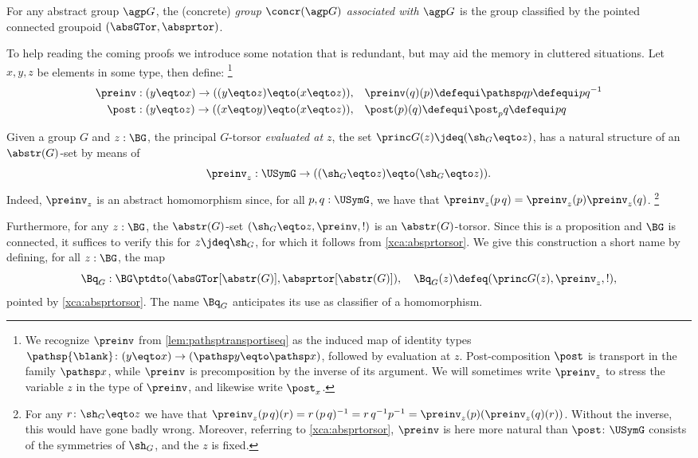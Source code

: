 \begin{definition}\label{def:concr}
  For any abstract group ${\agp G}$, the (concrete) 
  \emph{group $\concr({\agp G})$ associated with ${\agp G}$} 
  is the group classified by the pointed connected groupoid 
  $(\absGTor,\absprtor)$.
\end{definition}

To help reading the coming proofs we introduce some notation that is
redundant, but may aid the memory in cluttered situations.
Let $x,y,z$ be elements in some type, then define:%
\footnote{We recognize $\preinv$ from \cref{lem:pathsptransportiseq}
as the induced map of identity types $\pathsp{\blank}\colon (y\eqto x)
\to(\pathsp y \eqto \pathsp x)$, followed by evaluation at $z$.
Post-composition $\post$ is transport in the family $\pathsp x$,
while $\preinv$ is precomposition by the inverse of its argument.
We will sometimes write $\preinv_z$ to stress the variable $z$
in the type of $\preinv$, and likewise write $\post_x$.}
\begin{align*}
  \preinv:(y\eqto x)\to ((y\eqto z)\eqto (x\eqto z)),\quad&\preinv(q)(p)\defequi\pathsp qp\defequi pq^{-1}\\
  \post:(y\eqto z)\to ((x\eqto y)\eqto (x\eqto z)),\quad&\post(p)(q)\defequi\post_pq\defequi pq
\end{align*}

\begin{example}\label{ex:BqG}
  Given a group $G$ and $z:\BG$, the principal $G$-torsor
  \emph{evaluated at $z$}, \ie the set $\princ G(z)\jdeq (\sh_G\eqto z)$,
  has a natural structure of an $\abstr(G)$-set by means of
  $$\preinv_z:\USymG\to ((\sh_G\eqto z)\eqto (\sh_G\eqto z)).$$
  Indeed, $\preinv_z$ is an abstract homomorphism since,
  for all $p,q:\USymG$, we have that 
  $\preinv_z(p\,q)=\preinv_z(p)\preinv_z(q)$.%
  \footnote{For any $r\colon \sh_G\eqto z$ we have that
  $\preinv_z(p\, q)(r)=r\,(p\,q)^{-1}=r\,q^{-1} p^{-1}=
  \preinv_z(p)(\preinv_z(q)(r))$.
  Without the inverse, this would have gone badly wrong.
  Moreover, referring to \cref{xca:absprtorsor},
  $\preinv$ is here more natural than $\post$:
  $\USymG$ consists of the symmetries of $\sh_G$, and the $z$ is fixed.}

  Furthermore, for any $z:\BG$, the $\abstr(G)$-set 
  $(\sh_G\eqto z,\preinv,!)$ is an $\abstr(G)$-torsor.
  Since this is a proposition and $\BG$ is connected, it suffices
  to verify this for $z\jdeq\sh_G$, for which it follows from
  \cref{xca:absprtorsor}.  
  We give this construction a short name by defining, for all $z:\BG$,
  the map
  \[
  \Bq_G:\BG\ptdto (\absGTor[\abstr(G)],\absprtor[\abstr(G)]),\quad \Bq_G(z)
  \defeq(\princ G(z),\preinv_z,!),
  \]
  pointed by \cref{xca:absprtorsor}. The name $\Bq_G$ anticipates
  its use as classifier of a homomorphism.
\end{example}

